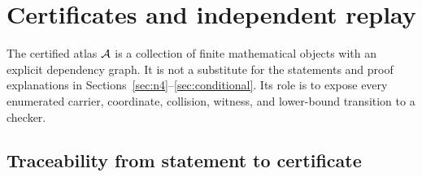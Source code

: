 \section{Certificates and independent replay}
\label{sec:atlas}

The certified atlas $\mathcal{A}$ is a collection of finite mathematical objects with an
explicit dependency graph.  It is not a substitute for the statements and
proof explanations in Sections~\ref{sec:n4}--\ref{sec:conditional}.  Its role
is to expose every enumerated carrier, coordinate, collision, witness, and
lower-bound transition to a checker.



\subsection{Traceability from statement to certificate}

